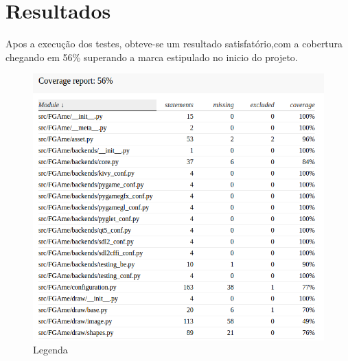 \chapter{Resultados}

Apos a execução dos testes, obteve-se um resultado satisfatório,com a cobertura chegando em 56\% superando a marca estipulado no inicio do projeto.

\begin{figure}[!htb]
\centering
\includegraphics[scale=0.6]{figuras/coverage}
\caption{Legenda}
\label{Rotulo}
\end{figure}
